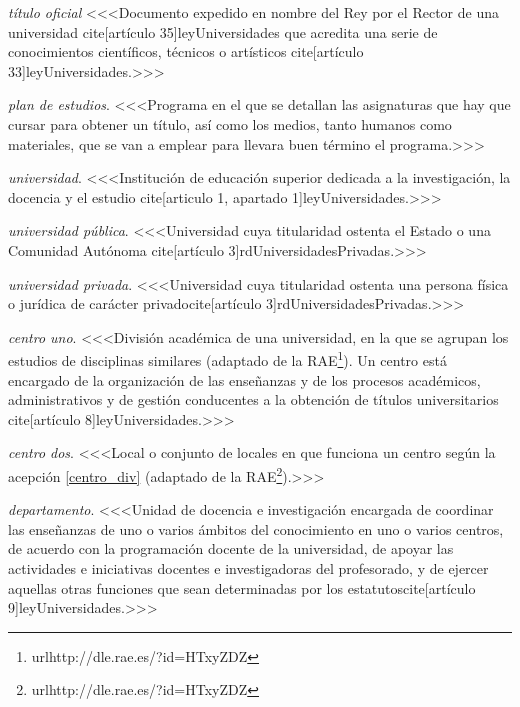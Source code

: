     \item \emph{título oficial} <<<Documento expedido en nombre del Rey por el Rector de una universidad cite[artículo 35]{leyUniversidades} que acredita una serie de conocimientos científicos, técnicos o artísticos cite[artículo 33]{leyUniversidades}.>>>

    \item \emph{plan de estudios}. <<<Programa en el que se detallan las asignaturas que hay que cursar para obtener un título, así como los medios, tanto humanos como materiales, que se van a emplear para llevara buen término el programa.>>>

    \item \emph{universidad}. <<<Institución de educación superior dedicada a la investigación, la docencia y el estudio cite[articulo 1, apartado 1]{leyUniversidades}.>>>

    \item \emph{universidad pública}. <<<Universidad cuya titularidad ostenta el Estado o una Comunidad Autónoma cite[artículo 3]{rdUniversidadesPrivadas}.>>>

    \item \emph{universidad privada}. <<<Universidad cuya titularidad ostenta una persona física o jurídica de carácter privadocite[artículo 3]{rdUniversidadesPrivadas}.>>>

    \item \emph{centro uno}. <<<División académica de una universidad, en la que se agrupan los estudios de disciplinas similares (adaptado de la RAE\footnote{url{http://dle.rae.es/?id=HTxyZDZ}}). Un centro está encargado de la organización de las enseñanzas y de los procesos académicos, administrativos y de gestión conducentes a la obtención de títulos universitarios cite[artículo 8]{leyUniversidades}.>>>

     \item \emph{centro dos}. <<<Local o conjunto de locales en que funciona un centro según la acepción \ref{centro_div} (adaptado de la RAE\footnote{url{http://dle.rae.es/?id=HTxyZDZ}}).>>>

    \item \emph{departamento}. <<<Unidad de docencia e investigación encargada de coordinar las enseñanzas de uno o varios ámbitos del conocimiento en uno o varios centros, de acuerdo con la programación docente de la universidad, de apoyar las actividades e iniciativas docentes e investigadoras del profesorado, y de ejercer aquellas otras funciones que sean determinadas por los estatutoscite[artículo 9]{leyUniversidades}.>>>

